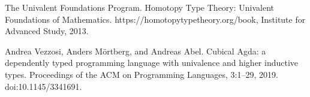 \par\noindent  [19]  The Univalent Foundations Program.  Homotopy Type Theory: Univalent Foundations of Mathematics.  https://homotopytypetheory.org/book, Institute for Advanced Study, 2013.  
 
\par\noindent  [20]  Andrea Vezzosi, Anders Mörtberg, and Andreas Abel.  Cubical Agda: a dependently typed programming language with univalence and higher inductive types.  Proceedings of the ACM on Programming Languages, 3:1–29, 2019.  doi:10.1145/3341691.  
  
